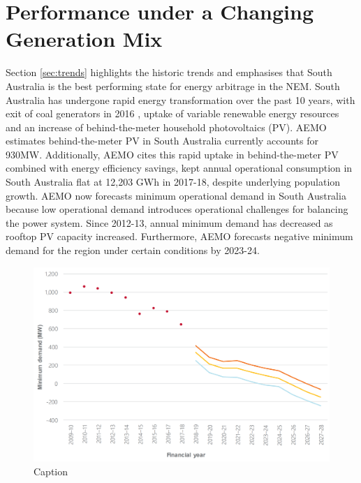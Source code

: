 \section{ Performance under a Changing Generation Mix}
Section \ref{sec:trends} highlights the historic trends and emphasises that South Australia is the best performing state for energy arbitrage in the NEM. South Australia has undergone rapid energy transformation over the past 10 years, with exit of coal generators in 2016 \parencite{sa_coal}, uptake of variable renewable energy resources and an increase of behind-the-meter household photovoltaics (PV). AEMO estimates behind-the-meter PV in South Australia currently accounts for 930MW. Additionally, AEMO cites this rapid uptake in behind-the-meter PV combined with energy efficiency savings, kept annual operational consumption in South Australia flat at 12,203 GWh in 2017-18, despite underlying population growth. 
\newline
\newline
AEMO now forecasts minimum operational demand in South Australia because low operational demand introduces operational challenges for balancing the power system. Since 2012-13, annual minimum demand has decreased as rooftop PV capacity increased. Furthermore, AEMO forecasts negative minimum demand for the region under certain conditions by 2023-24. 
\begin{figure}[H]
    \centering
    \includegraphics[width=\textwidth]{Pictures/Chapter3/minimum_demand.png}
    \caption{Caption}
    \label{fig:minimum_demand}
\end{figure}
